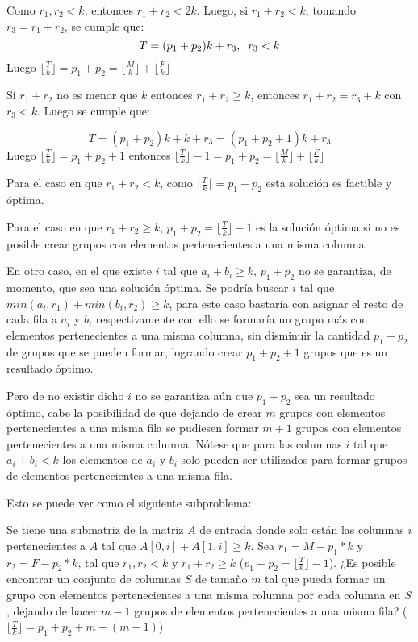 \documentclass[article]{llncs}
\begin{document}
Como $r_1, r_2 < k$, entonces $r_1 + r_2 < 2k$. Luego, si $r_1 + r_2 < k$, tomando 
$r_3 = r_1 + r_2$, se cumple que:
$$T = (p_1 + p_2)k + r_3, \hspace{0,2 cm} r_3 < k$$
Luego $\lfloor \frac{T}{k}\rfloor = p_1 + p_2 = \lfloor \frac{M}{k}\rfloor  + \lfloor \frac{F}{k}\rfloor$

\vspace{0,2 cm}

Si $r_1 + r_2$ no es menor que $k$ entonces $r_1 + r_2 \geq k$, entonces $r_1 + r_2 = r_3 + k$
con $r_3 < k$. Luego se cumple que:

$$T = (p_1 + p_2)k + k + r_3 = (p_1 + p_2 + 1)k + r_3$$
Luego $\lfloor \frac{T}{k}\rfloor = p_1 + p_2 + 1$ entonces $\lfloor \frac{T}{k}\rfloor -1 = p_1 + p_2 = \lfloor \frac{M}{k}\rfloor  + \lfloor \frac{F}{k}\rfloor$

\vspace{0,2 cm}

Para el caso en que $r_1 + r_2 < k$, como $\lfloor \frac{T}{k}\rfloor = p_1 + p_2$ esta solución es factible 
y óptima.

Para el caso en que $r_1 + r_2 \geq k$, $p_1 + p_2 = \lfloor \frac{T}{k}\rfloor -1$ es 
la soluci\'on \'optima si no es posible crear grupos con elementos pertenecientes a una misma columna.

En otro caso, en el que existe $i$ tal que $a_i + b_i \geq k$, $p_1 + p_2$
no se garantiza, de momento, que sea una solución \'optima. Se podr\'ia 
buscar $i$ tal que $min(a_i, r_1) + min(b_i, r_2) \geq k$, para este caso 
bastar\'ia con asignar el resto de cada fila a $a_i$ y $b_i$ respectivamente
con ello se formar\'ia un grupo m\'as con elementos pertenecientes a una misma columna, 
sin disminuir la cantidad $p_1 + p_2$ de grupos que se pueden formar, logrando 
crear $p_1 + p_2 + 1$ grupos que es un resultado \'optimo.

Pero de no existir dicho $i$ no se garantiza a\'un que $p_1 + p_2$ sea 
un resultado \'optimo, cabe la posibilidad de que dejando de crear 
$m$ grupos con elementos pertenecientes a una misma fila se pudiesen 
formar $m+1$ grupos con elementos pertenecientes a una misma columna.
N\'otese que para las columnas $i$ tal que $a_i + b_i < k$ los elementos 
de $a_i$ y $b_i$ solo pueden ser utilizados para formar grupos de elementos
pertenecientes a una misma fila.

Esto se puede ver como el siguiente subproblema:

Se tiene una submatriz de la matriz $A$ de entrada donde solo est\'an 
las columnas $i$ pertenecientes a $A$ tal que $A[0, i] + A[1, i] \geq k$.
Sea $r_1 = M - p_1*k$ y $r_2 = F - p_2*k$, tal que $r_1, r_2 < k$ y 
$r_1 + r_2 \geq k$ ($p_1 + p_2 = \lfloor\frac{T}{k}\rfloor - 1$). ¿Es posible encontrar un conjunto de columnas $S$ de 
tamaño $m$ tal que pueda formar un grupo con elementos pertenecientes a 
una misma columna por cada columna en $S$, dejando de hacer $m-1$ grupos 
de elementos pertenecientes a una misma fila? ($\lfloor\frac{T}{k}\rfloor = p_1 + p_2 + m - (m-1)$)
\end{document}
